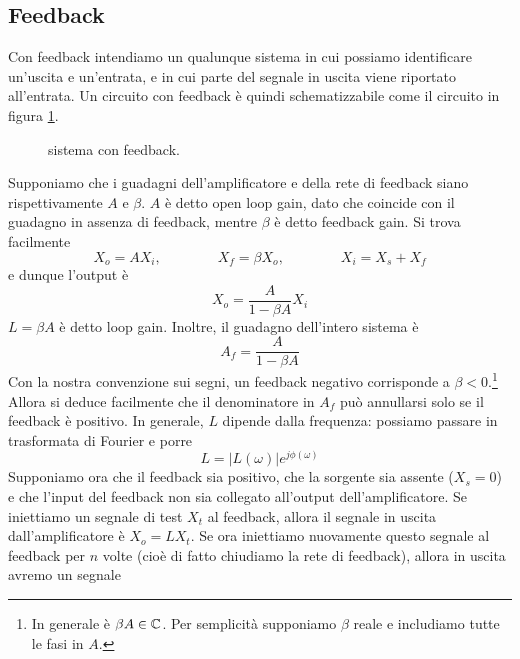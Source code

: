 \documentclass[a4paper, 11pt]{article}
\begin{document}
	\subsection{Feedback}
	Con feedback intendiamo un qualunque sistema in cui possiamo identificare un'uscita e un'entrata, e in cui parte del segnale in uscita viene riportato all'entrata. Un circuito con feedback è quindi schematizzabile come il circuito in figura \ref{fig:feedback}.
\begin{figure}[h!]
	\centering
	\caption{sistema con feedback.}
	\label{fig:feedback}
\end{figure}
Supponiamo che i guadagni dell'amplificatore e della rete di feedback siano rispettivamente $A$ e $\beta$. $A$ è detto open loop gain, dato che coincide con il guadagno in assenza di feedback, mentre $\beta$ è detto feedback gain. Si trova facilmente
\[X_o=AX_i,\qquad\qquad X_f=\beta X_o,\qquad\qquad X_i=X_s+X_f\]
e dunque l'output è
\[X_o=\frac{A}{1-\beta A}X_i\]
$L=\beta A$ è detto loop gain. Inoltre, il guadagno dell'intero sistema è
\[A_f=\frac{A}{1-\beta A}\]
Con la nostra convenzione sui segni, un feedback negativo corrisponde a $\beta<0$.\footnote{In generale è $\beta A\in \mathbb{C}$. Per semplicità supponiamo $\beta$ reale e includiamo tutte le fasi in $A$.} Allora si deduce facilmente che il denominatore in $A_f$ può annullarsi solo se il feedback è positivo. In generale, $L$ dipende dalla frequenza: possiamo passare in trasformata di Fourier e porre\[L=|L(\omega)|e^{j\phi(\omega)}\] Supponiamo ora che il feedback sia positivo, che la sorgente sia assente ($X_s=0$) e che l'input del feedback non sia collegato all'output dell'amplificatore. Se iniettiamo un segnale di test $X_t$ al feedback, allora il segnale in uscita dall'amplificatore è $X_o=LX_t$. Se ora iniettiamo nuovamente questo segnale al feedback per $n$ volte (cioè di fatto chiudiamo la rete di feedback), allora in uscita avremo un segnale
\end{document}
